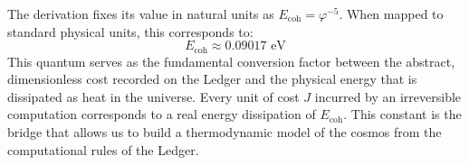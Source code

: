 \documentclass[12pt, aip, jcp]{revtex4-2} %
\begin{document}
The derivation fixes its value in natural units as \(E_{\text{coh}} = \varphi^{-5}\). When mapped to standard physical units, this corresponds to:
\begin{equation}
    E_{\text{coh}} \approx 0.09017 \text{ eV}
\end{equation}
This quantum serves as the fundamental conversion factor between the abstract, dimensionless cost recorded on the Ledger and the physical energy that is dissipated as heat in the universe. Every unit of cost \(J\) incurred by an irreversible computation corresponds to a real energy dissipation of \(E_{\text{coh}}\). This constant is the bridge that allows us to build a thermodynamic model of the cosmos from the computational rules of the Ledger.

\end{document}
